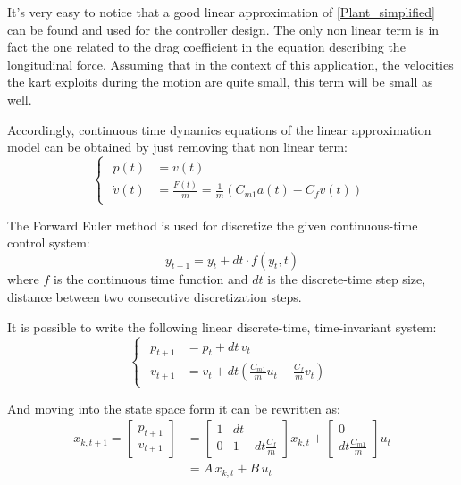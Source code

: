 \documentclass[a4paper,12pt,oneside]{book}
\begin{document}
\bigskip
It's very easy to notice that a good linear approximation of \ref{Plant_simplified} can be found and used for the controller design. 
The only non linear term is in fact the one related to the drag coefficient in the equation describing the longitudinal force.
Assuming that in the context of this application, the velocities the kart exploits during the motion are quite small, this term will be small as well.

Accordingly, continuous time dynamics equations of the linear approximation model can be obtained by just removing that non linear term:
\begin{equation}
\begin{cases}
 	\begin{aligned}
		\dot{p}(t) &= v(t) \\
		\dot{v}(t) &= \frac{F(t)}{m} = \frac{1}{m} (C_{m1} a(t) - C_f v(t) )
	\end{aligned}
\end{cases}
\label{CT_Linear_dynamics}
\end{equation}

\bigskip
The Forward Euler method is used for discretize the given continuous-time control system:
\begin{equation}
    y_{t+1} = y_t + dt \cdot f(y_t, t) 
\end{equation}
where $f$ is the continuous time function and $dt$ is the discrete-time step size, distance between two consecutive discretization steps.

It is possible to write the following linear discrete-time, time-invariant system:
\begin{equation}
\begin{cases}
	\begin{aligned}
		p_{t+1} &= p_t + dt \, v_t \\
		v_{t+1} &= v_t + dt \left( \frac{C_{m1}}{m} u_t - \frac{C_f}{m} v_t  \right)
	\end{aligned}
\end{cases}
\end{equation}

And moving into the state space form it can be rewritten as:
\begin{equation}
    \begin{aligned}
    	x_{k,t+1} = 
    		\begin{bmatrix}
    			p_{t+1} \\
    			v_{t+1}
    		\end{bmatrix}
    		& =
    		\begin{bmatrix}
    			1 & dt \\
    			0 & 1-dt\frac{C_f}{m}
    		\end{bmatrix}
    		x_{k,t}
    		+
    		\begin{bmatrix}
    			0 \\
    			dt \frac{C_{m1}}{m}
    		\end{bmatrix}
    		u_t \\
    		& = A \, x_{k,t} + B \, u_t
    \end{aligned}
\label{Linear_system}
\end{equation}
\end{document}
